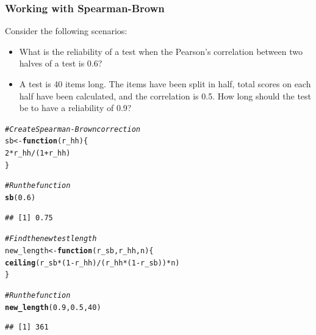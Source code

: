 \documentclass[dvipsnames]{beamer}\usepackage[]{graphicx}\usepackage[]{color}
\makeatletter
\newcommand{\hlnum}[1]{\textcolor[rgb]{0.686,0.059,0.569}{#1}}%
\newcommand{\hlcom}[1]{\textcolor[rgb]{0.678,0.584,0.686}{\textit{#1}}}%
\newcommand{\hlopt}[1]{\textcolor[rgb]{0,0,0}{#1}}%
\newcommand{\hlstd}[1]{\textcolor[rgb]{0.345,0.345,0.345}{#1}}%
\newcommand{\hlkwa}[1]{\textcolor[rgb]{0.161,0.373,0.58}{\textbf{#1}}}%
\newcommand{\hlkwb}[1]{\textcolor[rgb]{0.69,0.353,0.396}{#1}}%
\newcommand{\hlkwc}[1]{\textcolor[rgb]{0.333,0.667,0.333}{#1}}%
\newcommand{\hlkwd}[1]{\textcolor[rgb]{0.737,0.353,0.396}{\textbf{#1}}}%
\newenvironment{kframe}{%
 \def\at@end@of@kframe{}%
 \ifinner\ifhmode%
  \def\at@end@of@kframe{\end{minipage}}%
  \begin{minipage}{\columnwidth}%
 \fi\fi%
 \def\FrameCommand##1{\hskip\@totalleftmargin \hskip-\fboxsep
 \colorbox{shadecolor}{##1}\hskip-\fboxsep
     \hskip-\linewidth \hskip-\@totalleftmargin \hskip\columnwidth}%
 \MakeFramed {\advance\hsize-\width
   \@totalleftmargin\z@ \linewidth\hsize
   \@setminipage}}%
 {\par\unskip\endMakeFramed%
 \at@end@of@kframe}
\newenvironment{knitrout}{}{} %
\makeatother
\begin{document}
\begin{frame}
\frametitle{Working with Spearman-Brown}
Consider the following scenarios:
  \begin{itemize}
    \item<1-> What is the reliability of a test when the Pearson's correlation between two halves of a test is 0.6?
    \item<2-> A test is 40 items long. The items have been split in half, total scores on each half have been calculated, and the correlation is 0.5. How long should the test be to have a reliability of 0.9?
  \end{itemize}
\end{frame}

\begin{frame}[fragile]

\begin{knitrout}
\color{fgcolor}\begin{kframe}
\begin{alltt}
\hlcom{# Create Spearman-Brown correction}
\hlstd{sb} \hlkwb{<-} \hlkwa{function}\hlstd{(}\hlkwc{r_hh}\hlstd{)\{}
  \hlnum{2} \hlopt{*} \hlstd{r_hh} \hlopt{/} \hlstd{(}\hlnum{1} \hlopt{+} \hlstd{r_hh)}
\hlstd{\}}

\hlcom{# Run the function}
\hlkwd{sb}\hlstd{(}\hlnum{0.6}\hlstd{)}
\end{alltt}
\begin{verbatim}
## [1] 0.75
\end{verbatim}
\begin{alltt}
\hlcom{# Find the new test length}
\hlstd{new_length} \hlkwb{<-} \hlkwa{function}\hlstd{(}\hlkwc{r_sb}\hlstd{,} \hlkwc{r_hh}\hlstd{,} \hlkwc{n}\hlstd{)\{}
  \hlkwd{ceiling}\hlstd{(r_sb} \hlopt{*} \hlstd{(}\hlnum{1} \hlopt{-} \hlstd{r_hh)} \hlopt{/} \hlstd{(r_hh} \hlopt{*} \hlstd{(}\hlnum{1} \hlopt{-} \hlstd{r_sb))} \hlopt{*} \hlstd{n)}
\hlstd{\}}

\hlcom{# Run the function}
\hlkwd{new_length}\hlstd{(}\hlnum{0.9}\hlstd{,} \hlnum{0.5}\hlstd{,} \hlnum{40}\hlstd{)}
\end{alltt}
\begin{verbatim}
## [1] 361
\end{verbatim}
\end{kframe}
\end{knitrout}
\end{frame}
\end{document}

